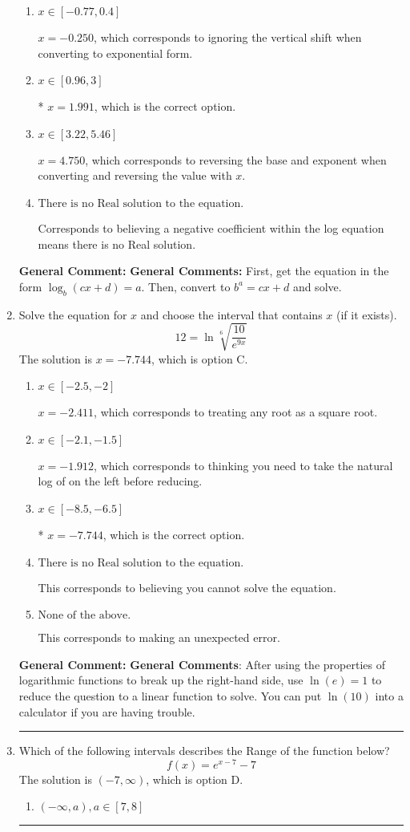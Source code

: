 \documentclass{extbook}[14pt]
\newcommand{\litem}[1]{\item #1

\rule{\textwidth}{0.4pt}}
\begin{document}
\begin{enumerate}
{\begin{enumerate}[label=\Alph*.]
$x = 8.750$, which corresponds to reversing the base and exponent when converting.
\item \( x \in [-0.77, 0.4] \)

$x = -0.250$, which corresponds to ignoring the vertical shift when converting to exponential form.
\item \( x \in [0.96, 3] \)

* $x = 1.991$, which is the correct option.
\item \( x \in [3.22, 5.46] \)

$x = 4.750$, which corresponds to reversing the base and exponent when converting and reversing the value with $x$.
\item \( \text{There is no Real solution to the equation.} \)

Corresponds to believing a negative coefficient within the log equation means there is no Real solution.
\end{enumerate}

\textbf{General Comment:} \textbf{General Comments:} First, get the equation in the form $\log_b{(cx+d)} = a$. Then, convert to $b^a = cx+d$ and solve.
}
\litem{
 Solve the equation for $x$ and choose the interval that contains $x$ (if it exists).
\[  12 = \ln{\sqrt[6]{\frac{10}{e^{9x}}}} \]
The solution is \( x = -7.744 \), which is option C.\begin{enumerate}[label=\Alph*.]
\item \( x \in [-2.5, -2] \)

$x = -2.411$, which corresponds to treating any root as a square root.
\item \( x \in [-2.1, -1.5] \)

$x = -1.912$, which corresponds to thinking you need to take the natural log of on the left before reducing.
\item \( x \in [-8.5, -6.5] \)

* $x = -7.744$, which is the correct option.
\item \( \text{There is no Real solution to the equation.} \)

This corresponds to believing you cannot solve the equation.
\item \( \text{None of the above.} \)

This corresponds to making an unexpected error.
\end{enumerate}

\textbf{General Comment:} \textbf{General Comments}: After using the properties of logarithmic functions to break up the right-hand side, use $\ln(e) = 1$ to reduce the question to a linear function to solve. You can put $\ln(10)$ into a calculator if you are having trouble.
}
\litem{
Which of the following intervals describes the Range of the function below?
\[ f(x) = e^{x-7}-7 \]
The solution is \( (-7, \infty) \), which is option D.\begin{enumerate}[label=\Alph*.]
\item \( (-\infty, a), a \in [7, 8] \)


\end{enumerate}}
\end{enumerate}
\end{document}
